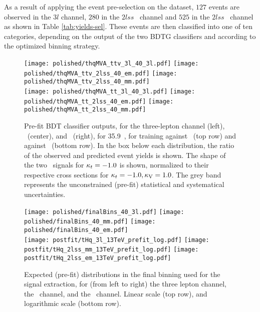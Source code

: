 As a result of applying the event pre-selection on the dataset, $127$ events are observed in the $3l$ channel, $280$ in the $2lss$ \mumu\ channel and  $525$ in the $2lss$ \emu\ channel as shown in Table \ref{tab:yields-sel}. These events are then classified into one of ten categories, depending on the output of the two BDTG classifiers and according to the optimized binning strategy.
\begin{figure}[!htb]
\begin{center}
 \centering
 \texttt{[image: polished/thqMVA\_ttv\_3l\_40\_3l.pdf]}
 \texttt{[image: polished/thqMVA\_ttv\_2lss\_40\_em.pdf]}
 \texttt{[image: polished/thqMVA\_ttv\_2lss\_40\_mm.pdf]} \\
 \texttt{[image: polished/thqMVA\_tt\_3l\_40\_3l.pdf]}
 \texttt{[image: polished/thqMVA\_tt\_2lss\_40\_em.pdf]}
 \texttt{[image: polished/thqMVA\_tt\_2lss\_40\_mm.pdf]}
\end{center}
\caption[Pre-fit BDT classifier outputs.]{Pre-fit BDT classifier outputs, for the three-lepton channel (left), \emu\ (center), and \mumu\ (right), for 35.9~\fbinv, for training against \ttV\ (top row) and against \ttbar\ (bottom row). In the box below each distribution, the ratio of the observed and predicted event yields is shown. The shape of the two \tH\ signals for $\kappa_t=-1.0$ is shown, normalized to their respective cross sections for $\kappa_t=-1.0, \kappa_\text{V}=1.0$. The grey band represents the unconstrained (pre-fit) statistical and systematical uncertainties.\label{fig:bdt_outputs_prefit}}
\end{figure}

\begin{figure} [!h]
 \centering
 \texttt{[image: polished/finalBins\_40\_3l.pdf]}
 \texttt{[image: polished/finalBins\_40\_mm.pdf]}
 \texttt{[image: polished/finalBins\_40\_em.pdf]} \\
 \texttt{[image: postfit/tHq\_3l\_13TeV\_prefit\_log.pdf]}
 \texttt{[image: postfit/tHq\_2lss\_mm\_13TeV\_prefit\_log.pdf]}
 \texttt{[image: postfit/tHq\_2lss\_em\_13TeV\_prefit\_log.pdf]}
\caption[Pre-fit distributions in the final binning.]{Expected (pre-fit) distributions in the final binning used for the signal extraction, for (from left to right) the three lepton channel, the \mumu\ channel, and the \emu\ channel. Linear scale (top row), and logarithmic scale (bottom row).}
\label{fig:finalbins_prefit}
\end{figure}

